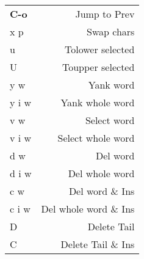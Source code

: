\documentclass[
  ,landscape
  ,columns=4
]{cheatsheet}
\begin{document}
\begin{tabular}{lr}
	\textbf{C-o} & Jump to Prev          \\
	x p          & Swap chars            \\
	u            & Tolower selected      \\
	U            & Toupper selected      \\
	y w          & Yank word             \\
	y i w        & Yank whole word       \\
	v w          & Select word           \\
	v i w        & Select whole word     \\
	d w          & Del word              \\
	d i w        & Del whole word        \\
	c w          & Del word \& Ins       \\
	c i w        & Del whole word \& Ins \\
	D            & Delete Tail           \\
	C            & Delete Tail \& Ins    \\
\end{tabular}
\end{document}
